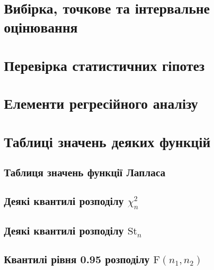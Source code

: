\documentclass{report}
\begin{document}
    \chapter{Вибірка, точкове та інтервальне оцінювання}
    \chapter{Перевірка статистичних гіпотез}
        
        
        
    \chapter{Елементи регресійного аналізу}
    \chapter*{Таблиці значень деяких функцій}
    \section*{Таблиця значень функції Лапласа}
        \newpage
    \section*{Деякі квантилі розподілу $\chi^2_{n}$}
        \newpage
    \section*{Деякі квантилі розподілу $\mathrm{St}_n$}
        \newpage
    \section*{Квантилі рівня 0.95 розподілу $\mathrm{F}(n_1, n_2)$}
        \newpage
\end{document}
